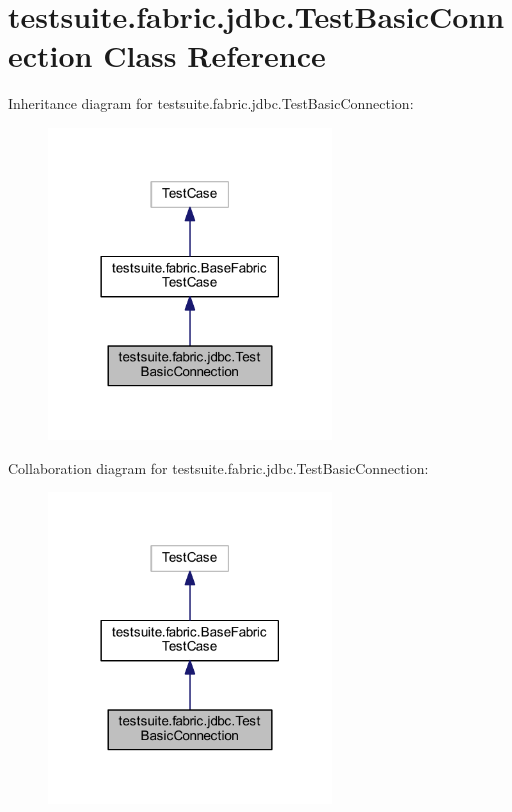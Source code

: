 \hypertarget{classtestsuite_1_1fabric_1_1jdbc_1_1_test_basic_connection}{}\section{testsuite.\+fabric.\+jdbc.\+Test\+Basic\+Connection Class Reference}
\label{classtestsuite_1_1fabric_1_1jdbc_1_1_test_basic_connection}


Inheritance diagram for testsuite.\+fabric.\+jdbc.\+Test\+Basic\+Connection\+:
\nopagebreak
\begin{figure}[H]
\begin{center}
\leavevmode
\includegraphics[width=213pt]{classtestsuite_1_1fabric_1_1jdbc_1_1_test_basic_connection__inherit__graph}
\end{center}
\end{figure}


Collaboration diagram for testsuite.\+fabric.\+jdbc.\+Test\+Basic\+Connection\+:
\nopagebreak
\begin{figure}[H]
\begin{center}
\leavevmode
\includegraphics[width=213pt]{classtestsuite_1_1fabric_1_1jdbc_1_1_test_basic_connection__coll__graph}
\end{center}
\end{figure}
